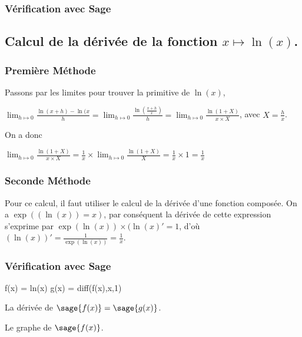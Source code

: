 \documentclass[a4paper,14pt]{extreport} %
\begin{document}
\subsubsection{Vérification avec Sage}



\subsection{Calcul de la dérivée de la fonction $x \mapsto \ln(x) $.}


\subsubsection{Première Méthode}


Passons par les limites pour trouver la primitive de $\ln(x)$,

$ \lim_{h \mapsto 0} \frac{\ln(x+h) - \ln(x}{h} = \lim_{h \mapsto 0} \frac{\ln(\frac{x+h}{x})}{h}  = \lim_{h \mapsto 0} \frac{ \ln(1+X)}{x\times X}$, avec $X=\frac{h}{x}$.


On a donc 

$\lim_{h \mapsto 0} \frac{\ln(1+X)}{x\times X} = \frac{1}{x} \times \lim_{h \mapsto 0} \frac{\ln(1+X)}{X} = \frac{1}{x} \times 1 = \frac{1}{x}$




\subsubsection{Seconde Méthode}

Pour ce calcul, il faut utiliser le calcul de la dérivée d'une fonction composée. On a $\exp((\ln(x))=x)$, par conséquent la dérivée de cette expression s'exprime par $ \exp(\ln(x)) \times (\ln(x)' = 1$, d'où $(\ln(x))' = \frac{1}{\exp(\ln(x))}  = \frac{1}{x} $.

\subsubsection{Vérification avec Sage}

\begin{sageblock}
    f(x) = ln(x)
    g(x) = diff(f(x),x,1)
\end{sageblock}

La dérivée de $\sage{f(x)} = \sage{g(x)} $.

Le graphe de $\sage{f(x)} $.


\begin{center}
 \\
\end{center}
\end{document}
